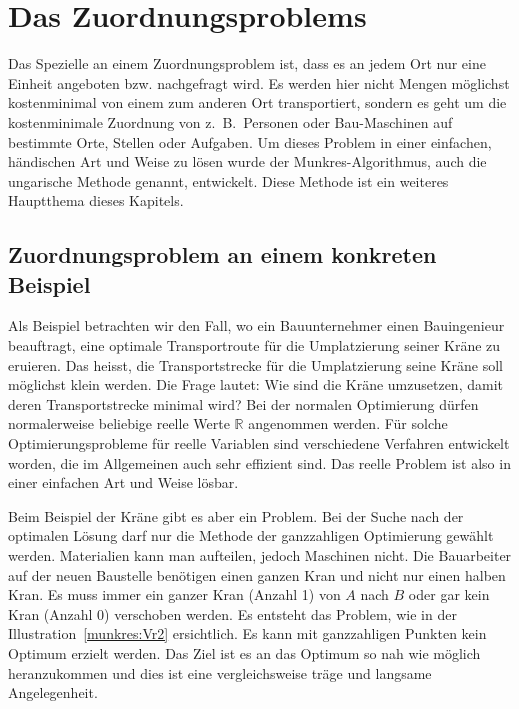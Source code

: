 %
%
%
\section{Das Zuordnungsproblems
\label{munkres:section:teil1}}

Das Spezielle an einem Zuordnungsproblem ist, dass es an jedem Ort nur eine Einheit angeboten bzw. nachgefragt wird. Es werden hier nicht Mengen möglichst kostenminimal von einem zum anderen
Ort transportiert, sondern es geht um die kostenminimale Zuordnung von z.~B.~Personen oder Bau-Maschinen auf bestimmte Orte, Stellen oder Aufgaben.
Um dieses Problem in einer einfachen, händischen Art und Weise zu lösen wurde der Munkres-Algorithmus, auch die ungarische Methode genannt, entwickelt. Diese Methode ist ein weiteres Hauptthema dieses Kapitels.
%
%

\subsection{Zuordnungsproblem an einem konkreten Beispiel
\label{munkres:subsection:bonorum}}
Als Beispiel betrachten wir den Fall, wo ein Bauunternehmer einen Bauingenieur beauftragt, eine optimale Transportroute für die Umplatzierung seiner Kräne zu eruieren. Das heisst, die Transportstrecke für die Umplatzierung seine Kräne
soll möglichst klein werden. 
Die Frage lautet: Wie sind die Kräne umzusetzen, damit deren Transportstrecke minimal wird? Bei der normalen Optimierung dürfen normalerweise beliebige reelle Werte $\mathbb{R}$ angenommen werden. 
%
Für solche Optimierungsprobleme für reelle Variablen sind verschiedene Verfahren entwickelt worden, die im Allgemeinen auch sehr effizient sind. Das reelle Problem ist also in einer einfachen Art und Weise lösbar.

Beim Beispiel der Kräne gibt es aber ein Problem. Bei der Suche nach der optimalen Lösung darf  nur die Methode der ganzzahligen Optimierung gewählt werden. Materialien kann man aufteilen, jedoch Maschinen nicht. Die Bauarbeiter auf der neuen Baustelle benötigen einen ganzen Kran und nicht nur einen halben Kran. Es muss immer ein ganzer Kran (Anzahl 1) von $A$ nach $B$ oder gar kein Kran (Anzahl 0) verschoben werden. 
%
%
Es entsteht das Problem, wie in der Illustration~\ref{munkres:Vr2} ersichtlich. Es kann mit ganzzahligen Punkten kein Optimum erzielt werden. Das Ziel ist es an das Optimum so nah wie möglich heranzukommen und dies ist eine vergleichsweise träge und langsame Angelegenheit.


